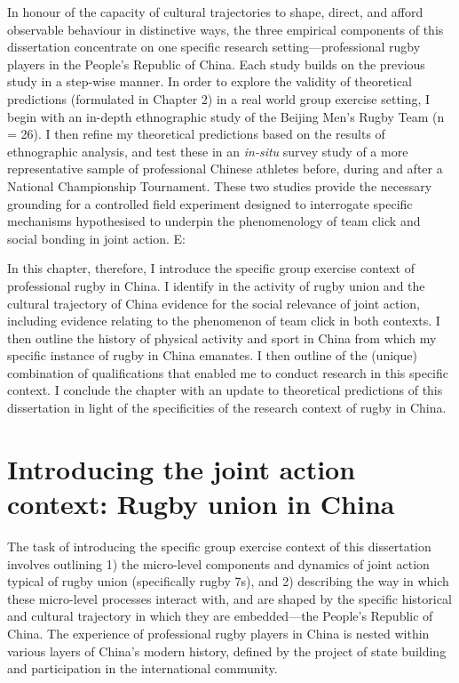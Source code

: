 In honour of the capacity of cultural trajectories to shape, direct, and afford observable behaviour in distinctive ways, the three empirical components of this dissertation concentrate on one specific research setting---professional rugby players in the People's Republic of China.  Each study builds on the previous study in a step-wise manner.  In order to explore the validity of theoretical predictions (formulated in Chapter 2) in a real world group exercise setting,  I begin with an in-depth ethnographic study of the Beijing Men's Rugby Team (n = 26).  I then refine my theoretical predictions based on the results of ethnographic analysis, and test these in an \textit{in-situ} survey study of a more representative sample of professional Chinese athletes before, during and after a National Championship Tournament.  These two studies provide the necessary grounding for a controlled field experiment designed to interrogate specific mechanisms hypothesised to underpin the phenomenology of team click and social bonding in joint action.
E:

In this chapter, therefore, I introduce the specific group exercise context of professional rugby in China.  I identify in the activity of rugby union and the cultural trajectory of China evidence for the social relevance of joint action, including evidence relating to the phenomenon of team click in both contexts.   I then outline the history of physical activity and sport in China from which my specific instance of rugby in China emanates.  I then outline of the (unique) combination of qualifications that enabled me to conduct research in this specific context.  I conclude the chapter with an update to theoretical predictions of this dissertation in light of the specificities of the research context of rugby in China.


\section{Introducing the joint action context: Rugby union in China}

The task of introducing the specific group exercise context of this dissertation involves outlining 1) the micro-level components and dynamics of joint action typical of rugby union (specifically rugby 7s), and 2) describing the way in which these micro-level processes interact with, and are shaped by the specific historical and cultural trajectory in which they are embedded---the People's Republic of China.  The experience of professional rugby players in China is nested within various layers of China's modern history, defined by the project of state building and participation in the international community.  

